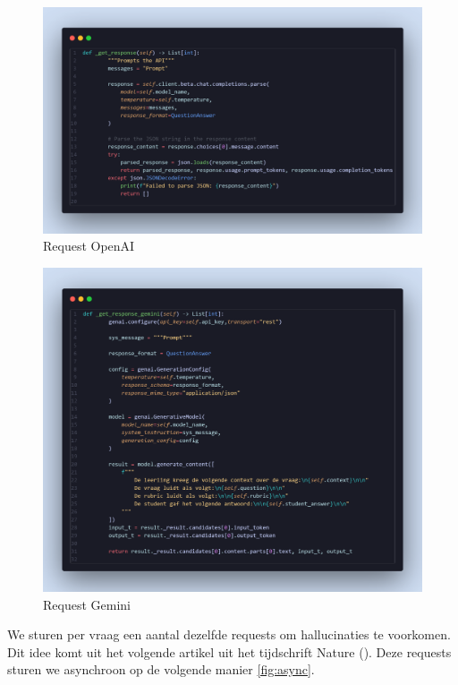 \documentclass[12pt]{article}
\begin{document}
\begin{figure}[H] %
    \centering
    \includegraphics[width=0.9 \textwidth]{./images/methoden/nakijken/get_response.png}
    \caption{Request OpenAI}
    \label{fig:OpenAI_request}
\end{figure}
\begin{figure}[H] %
    \centering
    \includegraphics[width=0.9 \textwidth]{./images/methoden/nakijken/response_gemini.png}
    \caption{Request Gemini}
    \label{fig:gemini_reques}
\end{figure}
We sturen per vraag een aantal dezelfde requests om hallucinaties te voorkomen. Dit idee komt uit het volgende artikel uit het tijdschrift Nature (\cite{Farquhar2024}). Deze requests sturen we asynchroon op de volgende manier \ref{fig:async}.
\end{document}
